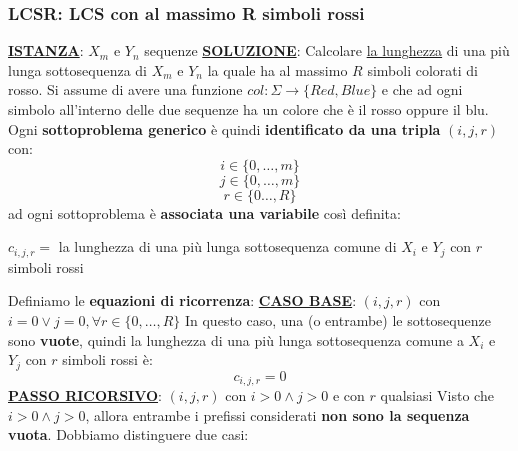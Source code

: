 \documentclass[12pt]{article}
\begin{document}
\subsubsection{LCSR: LCS con al massimo R simboli rossi}
\textbf{\underline{ISTANZA}}: $X_m$ e $Y_n$ sequenze \newline
\textbf{\underline{SOLUZIONE}}: Calcolare \underline{la lunghezza} di una più lunga sottosequenza di $X_m$ e $Y_n$ la quale ha al massimo $R$ simboli colorati di rosso. \newline
Si assume di avere una funzione $col: \Sigma \rightarrow \{Red, Blue\}$ e che ad ogni simbolo all'interno delle due sequenze ha un colore che è il rosso oppure il blu. \newline
Ogni \textbf{sottoproblema generico} è quindi \textbf{identificato da una tripla} $(i, j, r)$ con:
$$i \in \{0,\dots, m\}$$
$$j \in \{0,\dots, m\}$$
$$r \in \{0\dots, R\}$$
ad ogni sottoproblema è \textbf{associata una variabile} così definita:
\begin{center}
    $c_{i,j,r} =$ la lunghezza di una più lunga sottosequenza comune di $X_i$ e $Y_j$ con $r$ simboli rossi
\end{center}
Definiamo le \textbf{equazioni di ricorrenza}: \newline
\textbf{\underline{CASO BASE}}: $(i,j,r)$ con $i = 0 \vee j = 0, \forall r \in \{0,\dots,R\}$ \newline  
In questo caso, una (o entrambe) le sottosequenze sono \textbf{vuote}, quindi la lunghezza di una più lunga sottosequenza comune a $X_i$ e $Y_j$ con $r$ simboli rossi è:
$$c_{i,j,r} = 0$$
\textbf{\underline{PASSO RICORSIVO}}: $(i,j,r)$ con $i > 0 \land j > 0$ e con $r$ qualsiasi \newline
Visto che $i > 0 \land j > 0$, allora entrambe i prefissi considerati \textbf{non sono la sequenza vuota}. Dobbiamo distinguere due casi:
\end{document}
